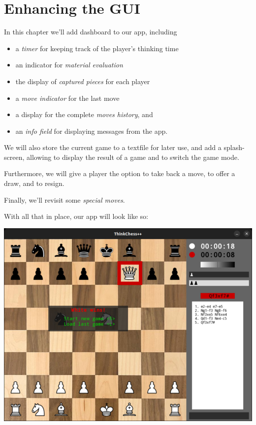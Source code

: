 \chapter{Enhancing the GUI}

In this chapter we'll add dashboard to our app, including
\begin{itemize}
  \item a \emph{timer} for keeping track of the player's thinking time
  \item an indicator for \emph{material evaluation}
  \item the display of \emph{captured pieces} for each player
  \item a \emph{move indicator} for the last move
  \item a display for the complete \emph{moves history}, and
  \item an \emph{info field} for displaying messages from the app.
\end{itemize}

We will also store the current game to a textfile for later use, and add a splash-screen,
allowing to display the result of a game and to switch the game mode.

Furthermore, we will give a player the option to take back a move, to offer a draw,
and to resign.

Finally, we'll revisit some \emph{special moves}.

With all that in place, our app will look like so:

\begin{center}
\includegraphics[width=\linewidth]{img/display.jpg}
\end{center}

